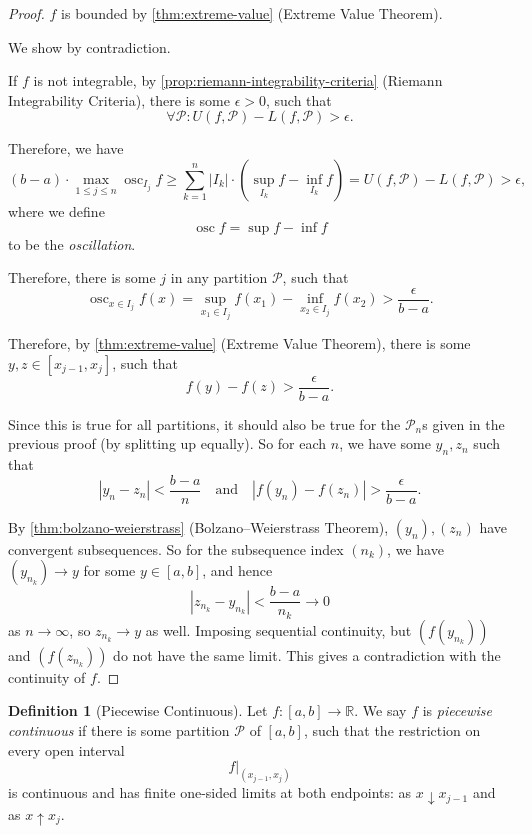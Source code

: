 \documentclass[11pt]{article}
\numberwithin{equation}{section}
\theoremstyle{definition}
\newtheorem{definition}[theorem]{Definition}
\theoremstyle{remark}
\newcommand{\pqty}[1]{\left(#1\right)}
\newcommand{\abs}[1]{\left|#1\right|}
\newcommand{\ccintv}[2]{[#1,#2]}
\newcommand{\oointv}[2]{(#1,#2)}
\newcommand{\functiondomain}[3]{#1:#2\to #3}
\newcommand{\RR}{\mathbb R}
\newcommand{\rightbar}[1]{\left.#1\right|}
\newcommand{\qand}{\quad\text{and}\quad}
\DeclareMathOperator{\osc}{osc}
\newcommand{\partition}{\mathcal P}
\newcommand{\upperSum}{U}
\newcommand{\lowerSum}{L}
\begin{document}
\begin{proof}
    \(f\) is bounded by \autoref{thm:extreme-value} (Extreme Value Theorem).

    We show by contradiction.

    If \(f\) is not integrable, by \autoref{prop:riemann-integrability-criteria} (Riemann Integrability Criteria), there is some \(\epsilon > 0\), such that
    \[
        \forall \partition: \upperSum\pqty{f, \partition} - \lowerSum\pqty{f, \partition} > \epsilon.
    \]

    Therefore, we have
    \[
        \pqty{b - a} \cdot \max_{1 \leq j \leq n} \osc_{I_j} f \geq \sum_{k = 1}^{n} \abs{I_k} \cdot \pqty{\sup_{I_k} f - \inf_{I_k} f} = \upperSum\pqty{f, \partition} - \lowerSum\pqty{f, \partition} > \epsilon,
    \]
    where we define
    \[
        \osc f = \sup f - \inf f
    \]
    to be the \emph{oscillation}.

    Therefore, there is some \(j\) in any partition \(\partition\), such that
    \[
        \osc_{x \in I_j} f\pqty{x} = \sup_{x_1 \in I_j} f\pqty{x_1} - \inf_{x_2 \in I_j} f\pqty{x_2} > \frac{\epsilon}{b - a}.
    \]

    Therefore, by \autoref{thm:extreme-value} (Extreme Value Theorem), there is some \(y, z \in \ccintv{x_{j - 1}}{x_j}\), such that
    \[
        f\pqty{y} - f\pqty{z} > \frac{\epsilon}{b - a}.
    \]

    Since this is true for all partitions, it should also be true for the \(\partition_n\)s given in the previous proof (by splitting up equally). So for each \(n\), we have some \(y_n, z_n\) such that
    \[
        \abs{y_n - z_n} < \frac{b - a}{n} \qand \abs{f\pqty{y_n} - f\pqty{z_n}} > \frac{\epsilon}{b - a}.
    \]

    By \autoref{thm:bolzano-weierstrass} (Bolzano--Weierstrass Theorem), \(\pqty{y_n}, \pqty{z_n}\) have convergent subsequences. So for the subsequence index \(\pqty{n_k}\), we have \(\pqty{y_{n_k}} \to y\) for some \(y \in \ccintv{a}{b}\), and hence
    \[
        \abs{z_{n_k} - y_{n_k}} < \frac{b - a}{n_k} \to 0
    \]
    as \(n \to \infty\), so \(z_{n_k} \to y\) as well. Imposing sequential continuity, but \(\pqty{f\pqty{y_{n_k}}}\) and \(\pqty{f\pqty{z_{n_k}}}\) do not have the same limit. This gives a contradiction with the continuity of \(f\).
\end{proof}

\begin{definition}[Piecewise Continuous]\label{analysis-unit-0152}
    \label{def:piecewise-continuous}%
    Let \(\functiondomain{f}{\ccintv{a}{b}}{\RR}\). We say \(f\) is \emph{piecewise continuous} if there is some partition \(\partition\) of \(\ccintv{a}{b}\), such that the restriction on every open interval
    \[
        \rightbar{f}_{\oointv{x_{j - 1}}{x_j}}
    \]
    is continuous and has finite one-sided limits at both endpoints: as \(x\downarrow x_{j-1}\) and as \(x\uparrow x_j\).
\end{definition}
\end{document}
